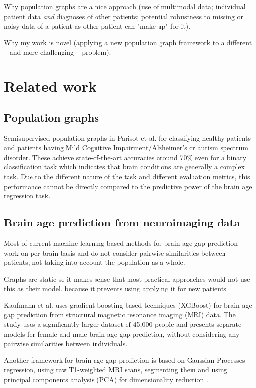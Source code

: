 Why population graphs are a nice approach (use of multimodal data; individual patient data \textit{and} diagnoses of other patients; potential robustness to missing or noisy data of a patient as other patient can "make up" for it).

Why my work is novel (applying a new population graph framework to a different – and more challenging – problem).

\section{Related work}
\subsection{Population graphs}
Semisupervised population graphs in Parisot et al. for classifying healthy patients and patients having Mild Cognitive Impairment/Alzheimer's or autism spectrum disorder. These achieve state-of-the-art accuracies around 70\% even for a binary classification task which indicates that brain conditions are generally a complex task. Due to the different nature of the task and different evaluation metrics, this performance cannot be directly compared to the predictive power of the brain age regression task.

\subsection{Brain age prediction from neuroimaging data}
Most of current machine learning-based methods for brain age gap prediction work on per-brain basis and do not consider pairwise similarities between patients, not taking into account the population as a whole.

Graphs are static so it makes sense that most practical approaches would not use this as their model, because it prevents using applying it for new patients

Kaufmann et al. \cite{kaufmann2019} uses gradient boosting based techniques (XGBoost) \cite{chen2016xgboost} for brain age gap prediction from structural magnetic resonance imaging (MRI) data. The study uses a significantly larger dataset of 45,000 people and presents separate models for female and male brain age gap prediction, without considering any pairwise similarities between individuals.

Another framework for brain age gap prediction is based on Gaussian Processes regression, using raw T1-weighted MRI scans, segmenting them and using principal components analysis (PCA) for dimensionality reduction \cite{cole2018brain}.
